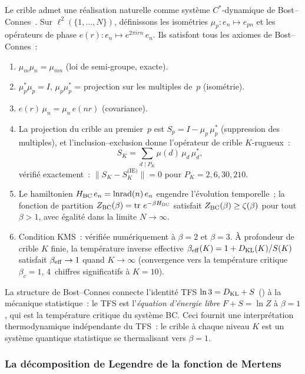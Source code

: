 \documentclass[12pt,a4paper]{article}
\begin{document}
Le crible admet une réalisation naturelle comme système
$C^*$-dynamique de Bost--Connes~\cite{BostConnes1995}.
Sur $\ell^2(\{1,\ldots,N\})$, définissons les isométries
$\mu_p\colon e_n \mapsto e_{pn}$ et les opérateurs de phase
$e(r)\colon e_n \mapsto e^{2\pi i r n}\,e_n$.
Ils satisfont tous les axiomes de Bost--Connes~:
\begin{enumerate}[nosep]
\item $\mu_m \mu_n = \mu_{mn}$ (loi de semi-groupe, exacte).
\item $\mu_p^* \mu_p = I$, $\mu_p \mu_p^*$ = projection sur les
  multiples de~$p$ (isométrie).
\item $e(r)\,\mu_n = \mu_n\,e(nr)$ (covariance).
\item La projection du crible au premier~$p$ est
  $S_p = I - \mu_p\,\mu_p^*$ (suppression des multiples), et
  l'inclusion--exclusion donne l'opérateur de crible $K$-rugueux~:
  \begin{equation}
    S_K = \sum_{d \mid P_K} \mu(d)\,\mu_d\,\mu_d^*,
    \label{eq:sieve_bc}
  \end{equation}
  vérifié exactement~: $\|S_K - S_K^{\text{(IE)}}\| = 0$ pour
  $P_K = 2,6,30,210$.
\item Le hamiltonien $H_{\rm BC}\,e_n = \ln\!\operatorname{rad}(n)\,e_n$
  engendre l'évolution temporelle~; la fonction de partition
  $Z_{\rm BC}(\beta) = \operatorname{tr}\,e^{-\beta H_{\rm BC}}$
  satisfait $Z_{\rm BC}(\beta) \geq \zeta(\beta)$ pour tout
  $\beta > 1$, avec égalité dans la limite $N \to \infty$.
\item Condition KMS~: vérifiée numériquement à $\beta = 2$ et
  $\beta = 3$. À profondeur de crible $K$ finie, la température
  inverse effective $\beta_{\rm eff}(K) = 1 + D_{\rm KL}(K)/S(K)$
  satisfait $\beta_{\rm eff} \to 1$ quand $K \to \infty$ (convergence
  vers la température critique $\beta_c = 1$, 4~chiffres significatifs
  à $K = 10$).
\end{enumerate}

La structure de Bost--Connes connecte l'identité TFS
$\ln 3 = D_{\rm KL} + S$ (\cite{companion_M1}) à la mécanique
statistique~: le TFS est l'\emph{équation d'énergie libre}
$F + S = \ln Z$ à $\beta = 1$, qui est la température critique du
système BC. Ceci fournit une interprétation thermodynamique
indépendante du TFS~: le crible à chaque niveau $K$ est un système
quantique statistique se thermalisant vers $\beta = 1$.

\subsubsection{La décomposition de Legendre de la fonction de Mertens}
\label{subsec:ch7_legendre}
\end{document}
